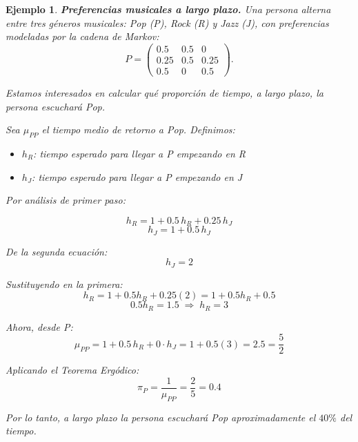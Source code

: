 \documentclass[12pt]{book}
\newtheorem{example}{Ejemplo}[chapter]
\begin{document}
\begin{example}
    \textbf{Preferencias musicales a largo plazo.} Una persona alterna entre tres géneros musicales: Pop (P), Rock (R) y Jazz (J), con preferencias modeladas por la cadena de Markov:
    \[
    P = \begin{pmatrix}
    0.5 & 0.5 & 0 \\
    0.25 & 0.5 & 0.25 \\
    0.5 & 0 & 0.5
    \end{pmatrix}.
    \]

    Estamos interesados en calcular qué proporción de tiempo, a largo plazo, la persona escuchará Pop.

    \medskip

    Sea $\mu_{PP}$ el tiempo medio de retorno a Pop. Definimos:
    \begin{itemize}
        \item $h_R$: tiempo esperado para llegar a P empezando en R
        \item $h_J$: tiempo esperado para llegar a P empezando en J
    \end{itemize}

    Por análisis de primer paso:

    \[
    h_R = 1 + 0.5\,h_R + 0.25\,h_J
    \]
    \[
    h_J = 1 + 0.5\,h_J
    \]

    De la segunda ecuación:
    \[
    h_J = 2
    \]

    Sustituyendo en la primera:
    \[
    h_R = 1 + 0.5h_R + 0.25(2)
    = 1 + 0.5h_R + 0.5
    \]
    \[
    0.5h_R = 1.5 \;\Rightarrow\; h_R = 3
    \]

    Ahora, desde P:
    \[
    \mu_{PP} = 1 + 0.5\,h_R + 0 \cdot h_J
    = 1 + 0.5(3) = 2.5 = \frac{5}{2}
    \]

    Aplicando el Teorema Ergódico:
    \[
    \pi_P = \frac{1}{\mu_{PP}} = \frac{2}{5} = 0.4
    \]

    Por lo tanto, a largo plazo la persona escuchará Pop aproximadamente el $\boxed{40\%}$ del tiempo.
\end{example}
\end{document}
